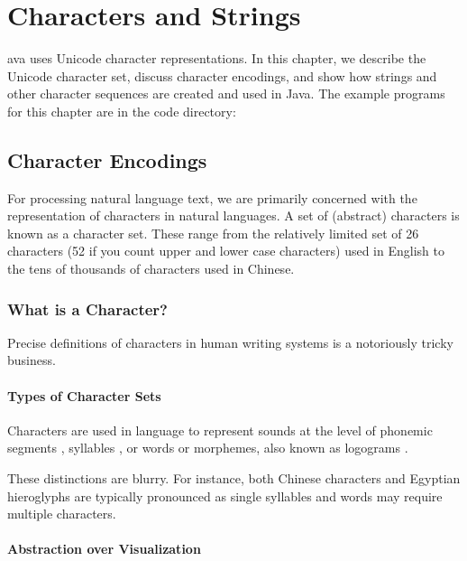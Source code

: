 \chapter{Characters and Strings}\label{chap:char}

ava uses Unicode character representations.
In this chapter, we describe the Unicode character set,
discuss character encodings, and show how strings and other character
sequences are created and used in Java.
The example programs for this chapter are in the code directory:
%


\section{Character Encodings}

For processing natural language text, we are primarily concerned with
the representation of characters in natural languages.  A set of
(abstract) characters is known as a character set.  These range from
the relatively limited set of 26 characters (52 if you count upper and
lower case characters) used in English to the tens of thousands of
characters used in Chinese.


\subsection{What is a Character?}

Precise definitions of characters in human writing systems is a
notoriously tricky business.  

\subsubsection{Types of Character Sets}

Characters are used in language to represent sounds at the level of
phonemic segments , syllables , or words or morphemes, also
known as logograms .  

These distinctions are blurry.  For instance, both Chinese characters
and Egyptian hieroglyphs are typically pronounced as single syllables
and words may require multiple characters.

\subsubsection{Abstraction over Visualization}

